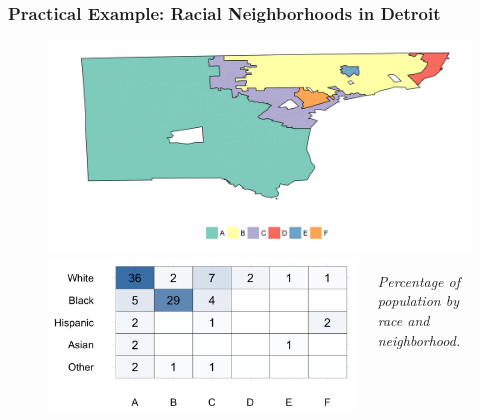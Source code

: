 \documentclass{beamer}
\begin{document}
	\begin{frame}[t ]\frametitle{Practical Example: Racial Neighborhoods in Detroit}
	    \begin{figure}
	    	\centering
	    	\includegraphics[width=.8\textwidth]{figs/example_cluster_map.png}
		\begin{columns}
			\begin{column}{0.6\textwidth}
				\includegraphics[width=\textwidth]{figs/example_clusters_detailed.png}
			\end{column}
			\begin{column}{0.3\textwidth}  
			     \emph{Percentage of population by race and neighborhood.}
			\end{column}
		\end{columns}
	    \end{figure}
	\end{frame}
	\iflong
\end{document}
